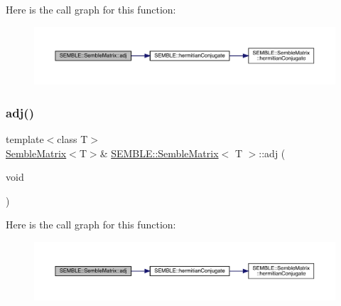 Here is the call graph for this function\+:
\nopagebreak
\begin{figure}[H]
\begin{center}
\leavevmode
\includegraphics[width=350pt]{df/d87/structSEMBLE_1_1SembleMatrix_a1005b8d94ad7731fe6826fd614203703_cgraph}
\end{center}
\end{figure}
\mbox{\label{structSEMBLE_1_1SembleMatrix_a1005b8d94ad7731fe6826fd614203703}} 
\subsubsection{\texorpdfstring{adj()}{adj()}\hspace{0.1cm}{\footnotesize\ttfamily [2/2]}}
{\footnotesize\ttfamily template$<$class T$>$ \\
\mbox{\hyperlink{structSEMBLE_1_1SembleMatrix}{Semble\+Matrix}}$<$T$>$\& \mbox{\hyperlink{structSEMBLE_1_1SembleMatrix}{S\+E\+M\+B\+L\+E\+::\+Semble\+Matrix}}$<$ T $>$\+::adj (\begin{DoxyParamCaption}\item[{void}]{ }\end{DoxyParamCaption})\hspace{0.3cm}{\ttfamily [inline]}}

Here is the call graph for this function\+:
\nopagebreak
\begin{figure}[H]
\begin{center}
\leavevmode
\includegraphics[width=350pt]{df/d87/structSEMBLE_1_1SembleMatrix_a1005b8d94ad7731fe6826fd614203703_cgraph}
\end{center}
\end{figure}
\mbox{\label{structSEMBLE_1_1SembleMatrix_a7553dc6264308f6f0755e46ed49c3df4}} 
